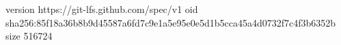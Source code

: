 version https://git-lfs.github.com/spec/v1
oid sha256:85f18a36b8b9d45587a6fd7c9e1a5e95e0e5d1b5cca45a4d0732f7c4f3b6352b
size 516724
